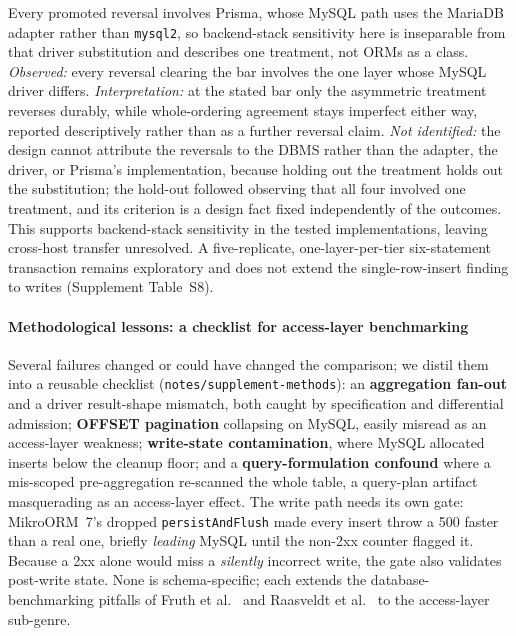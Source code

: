 Every promoted reversal involves Prisma, whose MySQL path uses the MariaDB adapter rather than
\texttt{mysql2}, so backend-stack sensitivity here is inseparable from that driver substitution and
describes one treatment, not ORMs as a class. \emph{Observed:} every reversal clearing the bar
involves the one layer whose MySQL driver differs. \emph{Interpretation:} at the stated bar only the
asymmetric treatment reverses durably, while whole-ordering agreement stays imperfect either way,
reported descriptively rather than as a further reversal claim. \emph{Not identified:} the design
cannot attribute the reversals to the DBMS rather than the adapter, the driver, or Prisma's
implementation, because holding out the treatment holds out the substitution; the hold-out followed
observing that all four involved one treatment, and its criterion is a design fact fixed
independently of the outcomes. This supports backend-stack sensitivity in the tested
implementations, leaving cross-host transfer unresolved. A five-replicate, one-layer-per-tier
six-statement transaction remains exploratory and does not extend the single-row-insert finding to
writes (Supplement Table~S8).

\paragraph{Methodological lessons: a checklist for access-layer benchmarking}
Several failures changed or could have changed the comparison; we distil them into a reusable
checklist (\texttt{notes/supplement-methods}): an \textbf{aggregation fan-out} and a driver
result-shape mismatch, both caught by specification and differential admission; \textbf{OFFSET
pagination} collapsing on MySQL, easily misread as an access-layer weakness; \textbf{write-state
contamination}, where MySQL allocated inserts below the cleanup floor; and a \textbf{query-formulation
confound} where a mis-scoped pre-aggregation re-scanned the whole table, a query-plan artifact
masquerading as an access-layer effect. The write path needs its own gate: MikroORM~7's dropped
\texttt{persistAndFlush} made every insert throw a 500 faster than a real one, briefly \emph{leading}
MySQL until the non-2xx counter flagged it. Because a 2xx alone would miss a \emph{silently}
incorrect write, the gate also validates post-write state. None is schema-specific; each extends the
database-benchmarking pitfalls of Fruth et al.~\cite{fruth2022tail} and Raasveldt et
al.~\cite{raasveldt2018fair} to the access-layer sub-genre.

